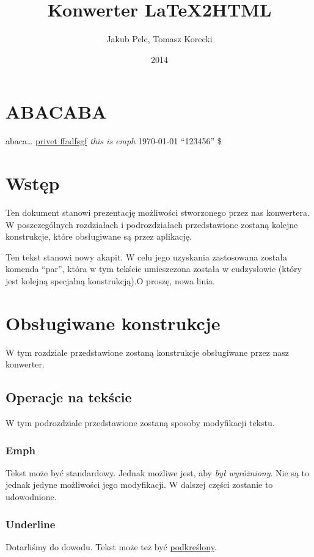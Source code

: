 \documentclass[10pt,a4paper]{article}
\title{Konwerter LaTeX2HTML}
\author{Jakub Pelc, Tomasz Korecki}
\date{2014}
\begin{document}
\maketitle

\section{ABACABA}
abaca\parhaha \ldots{}
\textcelsius{}
\underline{privet ffadfsgf}
\emph { this is emph}
\today{}
\textLambda{}
``123456''
\$

\section{Wstęp}
Ten dokument stanowi prezentację możliwości stworzonego przez nas konwertera. W poszczególnych rozdziałach i podrozdziałach przedstawione zostaną kolejne konstrukcje, które obsługiwane są przez aplikację.\par
Ten tekst stanowi nowy akapit. W celu jego uzyskania zastosowana została komenda ``par'', która w tym tekście umieszczona została w cudzysłowie (który jest kolejną specjalną konstrukcją).\newline O proszę, nowa linia.

\section{Obsługiwane konstrukcje}
W tym rozdziale przedstawione zostaną konstrukcje obsługiwane przez nasz konwerter.

\subsection{Operacje na tekście}
W tym podrozdziale przedstawione zostaną sposoby modyfikacji tekstu.

\subsubsection{Emph}
Tekst może być standardowy. Jednak możliwe jest, aby \emph{był wyróżniony}. Nie są to jednak jedyne możliwości jego modyfikacji. W dalszej części zostanie to udowodnione.

\subsubsection{Underline}
Dotarliśmy do dowodu. Tekst może też być \underline{podkreślony}.
\end{document}

